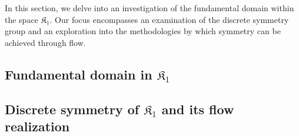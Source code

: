 In this section, we delve into an investigation of the fundamental domain within the space $\mathfrak{K}_1$. Our focus encompasses an examination of the discrete symmetry group and an exploration into the methodologies by which symmetry can be achieved through flow.

\subsection{Fundamental domain in $\mathfrak{K}_1$}

\subsection{Discrete symmetry of $\mathfrak{K}_1$ and its flow realization}

